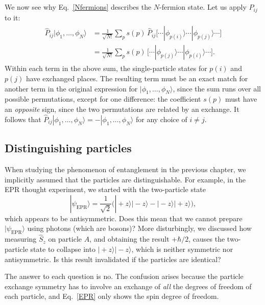 \documentclass[pra,12pt]{revtex4}
\begin{document}
We now see why Eq.~\eqref{Nfermions} describes the $N$-fermion state.
Let us apply $\hat{P}_{ij}$ to it:
\begin{align}
  \begin{aligned}
    \hat{P}_{ij}|\phi_1,\dots,\phi_N\rangle
    &= \frac{1}{\sqrt{N!}} \sum_p s(p)\, \hat{P}_{ij}
    \big[\cdots |\phi_{p(i)}\rangle \cdots
      |\phi_{p(j)}\rangle \cdots\big] \\
    &= \frac{1}{\sqrt{N!}} \sum_p s(p)\, \big[\cdots |\phi_{p(j)}\rangle
      \cdots |\phi_{p(i)}\rangle \cdots\big].
  \end{aligned}
\end{align}
Within each term in the above sum, the single-particle states for
$p(i)$ and $p(j)$ have exchanged places.  The resulting term must be
an exact match for another term in the original expression for
$|\phi_1,\dots,\phi_N\rangle$, since the sum runs over all
possible permutations, except for one difference: the coefficient
$s(p)$ must have an \textit{opposite} sign, since the two permutations
are related by an exchange.  It follows that
$\hat{P}_{ij}|\phi_1,\dots,\phi_N\rangle = -
|\phi_1,\dots,\phi_N\rangle$ for any choice of $i \ne j$.

\subsection{Distinguishing particles}

When studying the phenomenon of entanglement in the previous chapter,
we implicitly assumed that the particles are distinguishable.  For
example, in the EPR thought experiment, we started with the
two-particle state
\begin{equation}
  |\psi_{\mathrm{EPR}}\rangle = \frac{1}{\sqrt{2}} \Big(|\!+\!z\rangle |\!-\!z\rangle
  - |\!-\!z\rangle |\!+\!z\rangle \Big),
  \label{EPR}
\end{equation}
which appears to be antisymmetric.  Does this mean that we cannot
prepare $|\psi_{\mathrm{EPR}}\rangle$ using photons (which are
bosons)?  More disturbingly, we discussed how measuring $\hat{S}_z$ on
particle $A$, and obtaining the result $+\hbar/2$, causes the
two-particle state to collapse into $|\!+\!z\rangle |\!-\!z\rangle$,
which is neither symmetric nor antisymmetric.  Is this result
invalidated if the particles are identical?

The answer to each question is no.  The confusion arises because the
particle exchange symmetry has to involve an exchange of \textit{all}
the degrees of freedom of each particle, and Eq.~\eqref{EPR} only
shows the spin degree of freedom.
\end{document}
